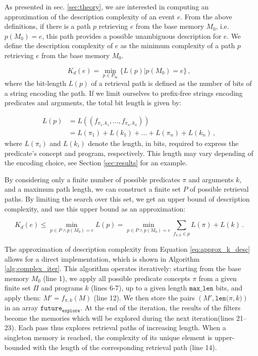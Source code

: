 \documentclass[entropy,article,submit,moreauthors,pdftex]{Definitions/mdpi}
\begin{document}
As presented in sec. \ref{sec:theory}, we are interested in computing an approximation of the description complexity of an event $e$. From the above definitions, if there is a path $p$ retrieving $e$ from the base memory $M_0$, i.e. $p(M_0) = e$, this path provides a possible unambiguous description for $e$. We define the description complexity of $e$ as the minimum complexity of a path $p$ retrieving $e$ from the base memory $M_0$.

\begin{equation}
    \label{eq:k_desc}
    K_d(e) = \min_{p \in P_\infty} \{L(p) | p(M_0) = e\}\,,
\end{equation}
where the bit-length $L(p)$ of a retrieval path is defined as the number of bits of a string encoding the path. If we limit ourselves to prefix-free strings encoding predicates and arguments, the total bit length is given by:

\begin{align}
    \label{eq:bit_lenght_p}
    L(p) & = L((f_{\pi_1,k_1}, \dots, f_{\pi_n, k_n}))     \\
         & = L(\pi_1) + L(k_1) + \dots + L(\pi_n) + L(k_n)\,,
\end{align}
where $L(\pi_i)$ and $L(k_i)$ denote the length, in bits, required to express the predicate's concept and program, respectively. This length may vary depending of the encoding choice, see Section \ref{sec:results} for an example.

By considering only a finite number of possible predicates $\pi$ and arguments $k$, and a maximum path length, we can construct a finite set $P$ of possible retrieval paths. By limiting the search over this set, we get an upper bound of description complexity, and use this upper bound as an approximation:

\begin{equation}
    \label{eq:approx_k_desc}
    K_d(e) \leq \min_{p \in P \land p(M_0) = e} L(p) = \min_{p \in P \land p(M_0)=e} \sum_{f_{\pi, k} \in p} L(\pi) + L(k)\,.
\end{equation}

The approximation of description complexity from Equation \ref{eq:approx_k_desc} allows for
a direct implementation, which is shown in Algorithm \ref{alg:complex_iter}. This
algorithm operates iteratively: starting from the base memory $M_0$
(line 1), we apply all possible predicate concepts $\pi$ from a given finite set
$\Pi$ and programs $k$ (lines 6-7), up to a given length $\mathtt
{max\_len}$ bits, and apply them: $M' = f_{\pi, k}(M)$ (line 12). We then store
the pairs $(M', \mathtt{len(}\pi, k\mathtt{)})$ in an array $\mathtt{future_
{explore}}$. At the end of the iteration, the results of the filters become the
memories which will be explored during the next iteration(lines 21--23). Each
pass thus explores retrieval paths of increasing length. When a singleton memory
is reached, the complexity of its unique element is upper-bounded with the
length of the corresponding retrieval path (line 14).
\end{document}
